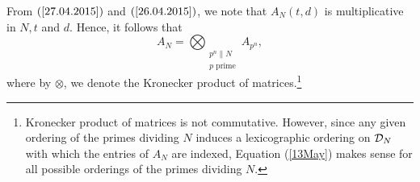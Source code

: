 \documentclass[a4paper,11pt]{amsart}
\begin{document}
From $(\ref{27.04.2015})$ and $(\ref{26.04.2015})$, we note that $A_N(t,d)$ is multiplicative in $N, t$ and $d$.
Hence, it follows that
\begin{equation}
 A_N=\bigotimes_{\substack{\ \\\ \\ p^n\|N\\\text{$p$ prime}}}A_{p^n},
\label{13May}\end{equation}
where by \hspace{1.5pt}$\otimes$\hspace{.2pt},  we denote the Kronecker product of matrices.\footnote{Kronecker product of matrices is
not commutative. However, %
since any given ordering of the primes dividing $N$ induces a lexicographic ordering on $\mathcal{D}_N$ %
with which the entries of $A_N$ are indexed, 
Equation (\ref{13May}) makes sense for all possible %
orderings of the primes dividing $N$.} 
\end{document}

